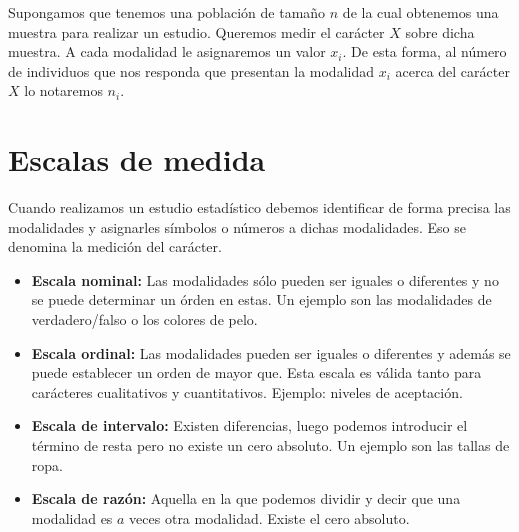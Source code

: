 \begin{notacion}
    Supongamos que tenemos una población de tamaño $n$ de la cual obtenemos una muestra para realizar un estudio. Queremos medir el carácter $X$ sobre dicha muestra. A cada modalidad le asignaremos un valor $x_{i}$. De esta forma, al número de individuos que nos responda que presentan la modalidad $x_{i}$ acerca del carácter $X$ lo notaremos $n_{i}$.
\end{notacion}

\section{Escalas de medida}

Cuando realizamos un estudio estadístico debemos identificar de forma precisa las modalidades y asignarles símbolos o números
a dichas modalidades. Eso se denomina la medición del carácter.

\begin{itemize}
    \item \textbf{Escala nominal:} Las modalidades sólo pueden ser iguales o diferentes y no se puede determinar un órden en estas. Un ejemplo son las modalidades de verdadero/falso
          o los colores de pelo.
    \item \textbf{Escala ordinal:} Las modalidades pueden ser iguales o diferentes y además se puede establecer un orden de mayor que. Esta escala es válida tanto para carácteres cualitativos y cuantitativos.
          Ejemplo: niveles de aceptación.
    \item \textbf{Escala de intervalo:} Existen diferencias, luego podemos introducir el término de resta pero no existe un cero absoluto. Un ejemplo son las tallas de ropa.
    \item \textbf{Escala de razón:} Aquella en la que podemos dividir y decir que una modalidad es $a$ veces otra modalidad. Existe el cero absoluto.
\end{itemize}

